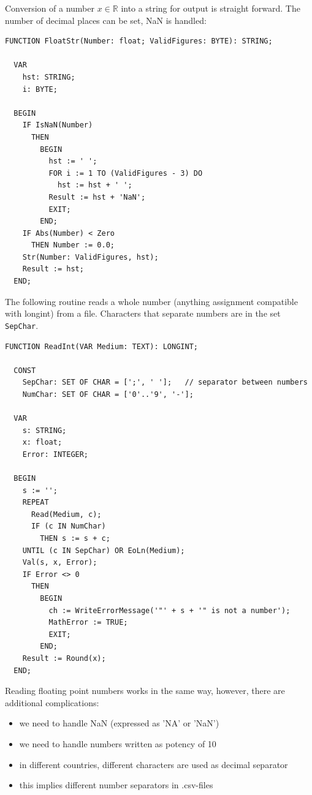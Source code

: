\begin{refsection}
Conversion of a number \(x \in \mathbb{R} \) into a string for output is straight forward. The number of decimal places can be set, \acs{NaN} is handled:
\begin{lstlisting}[caption=Conversion of floating point number to string]
  FUNCTION FloatStr(Number: float; ValidFigures: BYTE): STRING;

  VAR
    hst: STRING;
    i: BYTE;

  BEGIN
    IF IsNaN(Number)
      THEN
        BEGIN
          hst := ' ';
          FOR i := 1 TO (ValidFigures - 3) DO
            hst := hst + ' ';
          Result := hst + 'NaN';
          EXIT;
        END;
    IF Abs(Number) < Zero
      THEN Number := 0.0;
    Str(Number: ValidFigures, hst);
    Result := hst;
  END;
\end{lstlisting}

The following routine reads a whole number (anything assignment compatible with longint) from a file. Characters that separate numbers are in the set \texttt{SepChar}.

\begin{lstlisting}[caption=Read whole numbers from file]
  FUNCTION ReadInt(VAR Medium: TEXT): LONGINT;

  CONST
    SepChar: SET OF CHAR = [';', ' '];   // separator between numbers
    NumChar: SET OF CHAR = ['0'..'9', '-'];

  VAR
    s: STRING;
    x: float;
    Error: INTEGER;

  BEGIN
    s := '';
    REPEAT
      Read(Medium, c);
      IF (c IN NumChar)
        THEN s := s + c;
    UNTIL (c IN SepChar) OR EoLn(Medium);
    Val(s, x, Error);
    IF Error <> 0
      THEN
        BEGIN
          ch := WriteErrorMessage('"' + s + '" is not a number');
          MathError := TRUE;
          EXIT;
        END;
    Result := Round(x);
  END;
\end{lstlisting}

Reading floating point numbers works in the same way, however, there are additional complications:
\begin{itemize}
  \item{we need to handle \acs{NaN} (expressed as 'NA' or 'NaN')}
  \item{we need to handle numbers written as potency of 10}
  \item{in different countries, different characters are used as decimal separator}
  \item{this implies different number separators in .csv-files}
\end{itemize}


\end{refsection}
